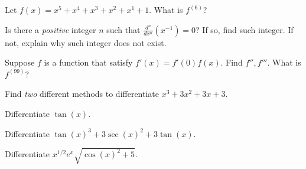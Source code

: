 \documentclass[../main.tex]{subfiles}
\begin{document}
\clearpage
\setcounter{thm}{2}
\begin{example}
  Let \(f(x) = x^{5} + x^{4} + x^{3} + x^{2} + x^{1} + 1\). What is \(f^{(6)}\)?
\end{example}
\vfill

\begin{example}
  Is there a \emph{positive} integer \(n\) such that \(\frac{d^{n}}{dx^{n}} \left( x^{-1} \right) = 0\)? If so, find such integer. If not, explain why such integer does not exist.
\end{example}
\vfill

\begin{example}
  Suppose \(f\) is a function that satisfy \(f'(x) = f'(0) f(x)\). Find \(f'', f'''\). What is \(f^{(99)}\)?
\end{example}
\vfill

\clearpage
\begin{example}
  Find \emph{two} different methods to differentiate \(x^{3} + 3x^{2} + 3x + 3\).
\end{example}
\vspace{2in}

\bigskip
\begin{example}
  Differentiate \(\tan(x)\). 
\end{example}

\vspace{3in}
\begin{example}
  Differentiate \(\tan(x)^{3} + 3 \sec(x)^{2} + 3\tan(x)\). 
\end{example}
\clearpage

\begin{example}
  Differentiate \(x^{1/2} e^{x} \sqrt{\cos(x)^{2} + 5}\).
\end{example}
\end{document}
